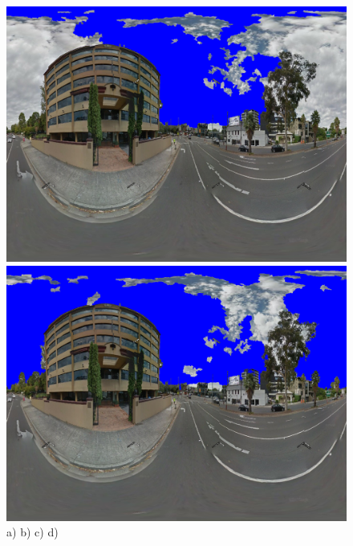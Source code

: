 \documentclass{article}
\begin{document}
\begin{figure}
\includegraphics[scale=0.08]{Images/mean/4880_5_7_210_ms_sky_mark.png} 
\includegraphics[scale=0.08]{Images/mean/4880_7_8_300_ms_sky_mark.png} 
\\
\scriptsize{a)}\hfil
\scriptsize{b)}\hfil
\scriptsize{c)}\hfil
\scriptsize{d)}\hfil

\end{figure} 
\end{document}
